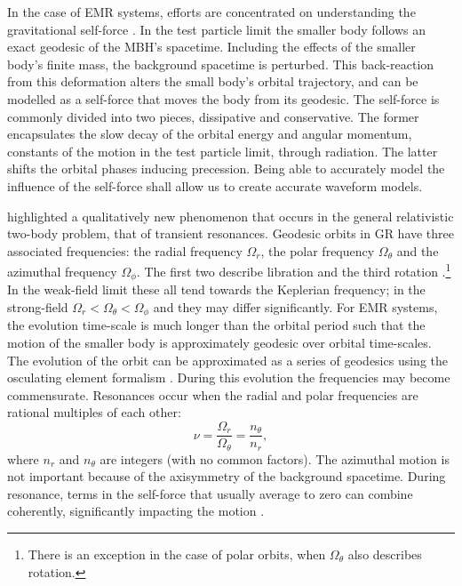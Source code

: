 In the case of EMR systems, efforts are concentrated on understanding the gravitational self-force \citep{Barack2009,Poisson2004}. In the test particle limit the smaller body follows an exact geodesic of the MBH's spacetime. Including the effects of the smaller body's finite mass, the background spacetime is perturbed. This back-reaction from this deformation alters the small body's orbital trajectory, and can be modelled as a self-force that moves the body from its geodesic. The self-force is commonly divided into two pieces, dissipative and conservative. The former encapsulates the slow decay of the orbital energy and angular momentum, constants of the motion in the test particle limit, through radiation. The latter shifts the orbital phases inducing precession.
Being able to accurately model the influence of the self-force shall allow us to create accurate waveform models.

\citet{Flanagan2012} highlighted a qualitatively new phenomenon that occurs in the general relativistic two-body problem, that of transient resonances. Geodesic orbits in GR have three associated frequencies: the radial frequency $\Omega_r$, the polar frequency $\Omega_\theta$ and the azimuthal frequency $\Omega_\phi$. The first two describe libration and the third rotation \citep[section 10.6]{Goldstein2002}.\footnote{There is an exception in the case of polar orbits, when $\Omega_\theta$ also describes rotation.} In the weak-field limit these all tend towards the Keplerian frequency; in the strong-field $\Omega_r < \Omega_\theta < \Omega_\phi$ and they may differ significantly. For EMR systems, the evolution time-scale is much longer than the orbital period such that the motion of the smaller body is approximately geodesic over orbital time-scales. The evolution of the orbit can be approximated as a series of geodesics using the osculating element formalism \citep{Pound2008,Gair2011a}. During this evolution the frequencies may become commensurate. Resonances occur when the radial and polar frequencies are rational multiples of each other:
\begin{equation}
\nu = \dfrac{\Omega_r}{\Omega_\theta} = \dfrac{n_\theta}{n_r},
\end{equation}
where $n_r$ and $n_\theta$ are integers (with no common factors). The azimuthal motion is not important because of the axisymmetry of the background spacetime. During resonance, terms in the self-force that usually average to zero can combine coherently, significantly impacting the motion \citep{Flanagan2012a}.

